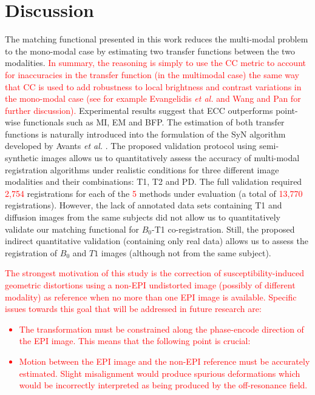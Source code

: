 \section{Discussion}
The matching functional presented in this work reduces the multi-modal problem to the mono-modal case by estimating two transfer functions between the two modalities. \textcolor{red}{In summary, the reasoning is simply to use the CC metric to account for inaccuracies in the transfer function (in the multimodal case) the same way that CC is used to add robustness to local brightness and contrast variations in the mono-modal case (see for example Evangelidis {\it et al.} \cite{Evangelidis2008} and Wang and Pan \cite{Wang2014} for further discussion).} Experimental results suggest that ECC outperforms point-wise functionals such as MI, EM and BFP. The estimation of both transfer functions is naturally introduced into the formulation of the SyN algorithm developed by Avants {\it et al.} \cite{Avants2008, Avants2011}. The proposed validation protocol using semi-synthetic images \cite{Ocegueda2015} allows us to quantitatively assess the accuracy of multi-modal registration algorithms under realistic conditions for three different image modalities and their combinations: T1, T2 and PD. The full validation required \textcolor{red}{2,754} registrations for each of the \textcolor{red}{5} methods under evaluation (a total of \textcolor{red}{13,770} registrations). However, the lack of annotated data sets containing T1 and diffusion images from the same subjects did not allow us to quantitatively validate our matching functional for $B_{0}$-T1 co-registration. Still, the proposed indirect quantitative validation (containing only real data) allows us to assess the registration of $B_{0}$ and $T1$ images (although not from the same subject). \textcolor{red}{The strongest motivation of this study is  the correction of susceptibility-induced geometric distortions using a non-EPI undistorted image (possibly of different modality) as reference when no more than one EPI image is available. Specific issues towards this goal that will be addressed in future research are:
\begin{itemize}
    \item{The transformation must be constrained along the phase-encode direction of the EPI image. This means that the following point is crucial:}
    \item{Motion between the EPI image and the non-EPI reference must be accurately estimated. Slight misalignment would produce spurious deformations which would be incorrectly interpreted as being produced by the off-resonance field.}

\end{itemize}}
